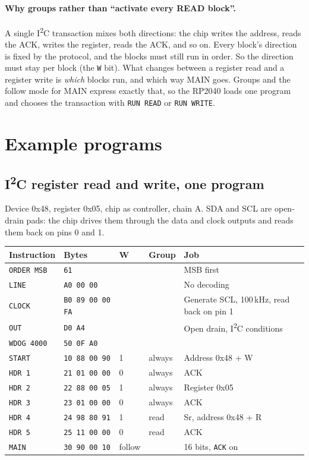 \documentclass[11pt,a4paper]{article}
\newcommand{\sig}[1]{\texttt{#1}}
\begin{document}
\paragraph{Why groups rather than ``activate every READ block''.} A single I\textsuperscript{2}C transaction mixes both directions: the chip writes the address, reads the ACK, writes the register, reads the ACK, and so on. Every block's direction is fixed by the protocol, and the blocks must still run in order. So the direction must stay per block (the \sig{W} bit). What changes between a register read and a register write is \emph{which} blocks run, and which way MAIN goes. Groups and the follow mode for MAIN express exactly that, so the RP2040 loads one program and chooses the transaction with \sig{RUN READ} or \sig{RUN WRITE}.

\section{Example programs}

\subsection{I\textsuperscript{2}C register read and write, one program}

Device 0x48, register 0x05, chip as controller, chain A. SDA and SCL are open-drain pads: the chip drives them through the data and clock outputs and reads them back on pins 0 and 1.

\begin{center}
\begin{tabular}{@{}lllll@{}}
\toprule
Instruction & Bytes & W & Group & Job \\
\midrule
\sig{ORDER MSB} & \texttt{61} & & & MSB first \\
\sig{LINE} & \texttt{A0 00 00} & & & No decoding \\
\sig{CLOCK} & \texttt{B0 89 00 00 FA} & & & Generate SCL, 100\,kHz, read back on pin 1 \\
\sig{OUT} & \texttt{D0 A4} & & & Open drain, I\textsuperscript{2}C conditions \\
\sig{WDOG 4000} & \texttt{50 0F A0} & & & \\
\sig{START} & \texttt{10 88 00 90} & 1 & always & Address 0x48 + W \\
\sig{HDR 1} & \texttt{21 01 00 00} & 0 & always & ACK \\
\sig{HDR 2} & \texttt{22 88 00 05} & 1 & always & Register 0x05 \\
\sig{HDR 3} & \texttt{23 01 00 00} & 0 & always & ACK \\
\sig{HDR 4} & \texttt{24 98 80 91} & 1 & read & Sr, address 0x48 + R \\
\sig{HDR 5} & \texttt{25 11 00 00} & 0 & read & ACK \\
\sig{MAIN} & \texttt{30 90 00 10} & follow & & 16 bits, \sig{ACK} on \\
\bottomrule
\end{tabular}
\end{center}
\end{document}
